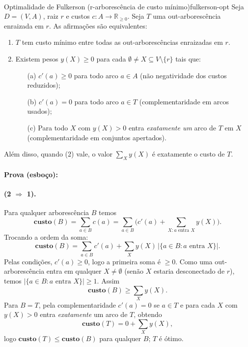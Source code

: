 \documentclass[12pt,a4paper]{article}
\begin{document}
\paragraph{}
\begin{teobox}{Optimalidade de Fulkerson (r-arborescência de custo mínimo)}{fulkerson-opt}
Seja $D=(V,A)$, raiz $r$ e custos $c:A\to\mathbb{R}_{\ge 0}$. Seja $T$ uma out-arborescência enraizada em $r$. As afirmações são equivalentes: 
\begin{enumerate}\setlength{\itemsep}{4pt}
    \item $T$ tem custo mínimo entre todas as out-arborescências enraizadas em $r$.
    \item Existem pesos $y(X)\ge 0$ para cada $\emptyset\neq X\subseteq V\setminus\{r\}$ tais que:
    \begin{enumerate}\setlength{\itemsep}{2pt}
         \item[(a)] $c'(a)\ge 0$ para todo arco $a\in A$ (não negatividade dos custos reduzidos);
         \item[(b)] $c'(a)=0$ para todo arco $a\in T$ (complementaridade em arcos usados);
         \item[(c)] Para todo $X$ com $y(X)>0$ entra \emph{exatamente um} arco de $T$ em $X$ (complementaridade em conjuntos apertados).
    \end{enumerate}
\end{enumerate}
Além disso, quando (2) vale, o valor $\sum_X y(X)$ é exatamente o custo de $T$.

\paragraph{}
	\textbf{Prova (esboço):}

\paragraph{(2 $\Rightarrow$ 1).} Para qualquer arborescência $B$ temos
\[
 	\textbf{custo}(B) = \sum_{a\in B} c(a) = \sum_{a\in B} \Big( c'(a) + \sum_{X: a\text{ entra }X} y(X) \Big).
\]
Trocando a ordem da soma:
\[
 	\textbf{custo}(B) = \sum_{a\in B} c'(a) + \sum_X y(X)\,\big| \{a\in B: a \text{ entra } X\}\big|.
\]
Pelas condições, $c'(a)\ge 0$, logo a primeira soma é $\ge 0$. Como uma out-arborescência entra em qualquer $X\neq\emptyset$ (senão $X$ estaria desconectado de $r$), temos $|\{a\in B: a \text{ entra } X\}|\ge 1$. Assim
\[
 	\textbf{custo}(B) \ge \sum_X y(X).
\]
Para $B=T$, pela complementaridade $c'(a)=0$ se $a\in T$ e para cada $X$ com $y(X)>0$ entra \emph{exatamente} um arco de $T$, obtendo
\[
 	\textbf{custo}(T) = 0 + \sum_X y(X),
\]
logo $\textbf{custo}(T) \le \textbf{custo}(B)$ para qualquer $B$; $T$ é ótimo.


\end{teobox}
\end{document}
